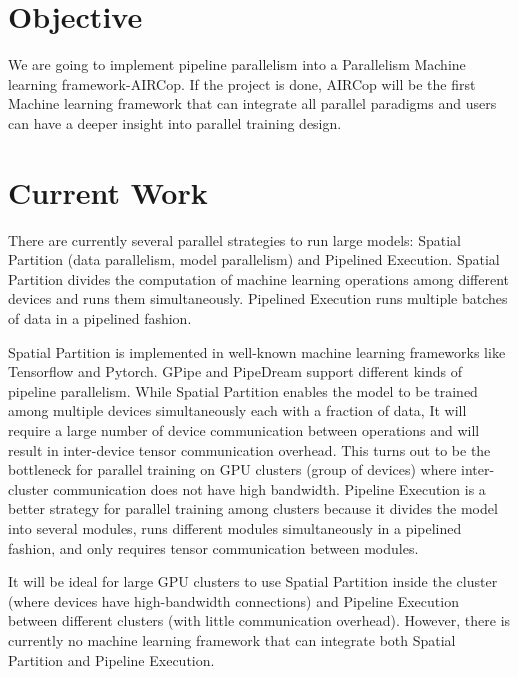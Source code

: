 \documentclass[sigplan]{acmart}\settopmatter{printfolios=true,printccs=false,printacmref=false}
\begin{document}





\maketitle

\section{Objective}
We are going to implement pipeline parallelism into a Parallelism Machine learning framework-AIRCop. If the project is done, AIRCop will be the first Machine learning framework that can integrate all parallel paradigms and users can have a deeper insight into parallel training design.

\section{Current Work}
There are currently several parallel strategies to run large models: Spatial Partition (data parallelism, model parallelism) and Pipelined Execution. Spatial Partition divides the computation of machine learning operations among different devices and runs them simultaneously. Pipelined Execution runs multiple batches of data in a pipelined fashion.\par
 Spatial Partition is implemented in well-known machine learning frameworks like Tensorflow and Pytorch. GPipe and PipeDream support different kinds of pipeline parallelism. While Spatial Partition enables the model to be trained among multiple devices simultaneously each with a fraction of data, It will require a large number of device communication between operations and will result in inter-device tensor communication overhead. This turns out to be the bottleneck for parallel training on GPU clusters (group of devices) where inter-cluster communication does not have high bandwidth. Pipeline Execution is a better strategy for parallel training among clusters because it divides the model into several modules, runs different modules simultaneously in a pipelined fashion, and only requires tensor communication between modules. \par
 It will be ideal for large GPU clusters to use Spatial Partition inside the cluster (where devices have high-bandwidth connections) and Pipeline Execution between different clusters (with little communication overhead). However, there is currently no machine learning framework that can integrate both Spatial Partition and Pipeline Execution.
\end{document}
